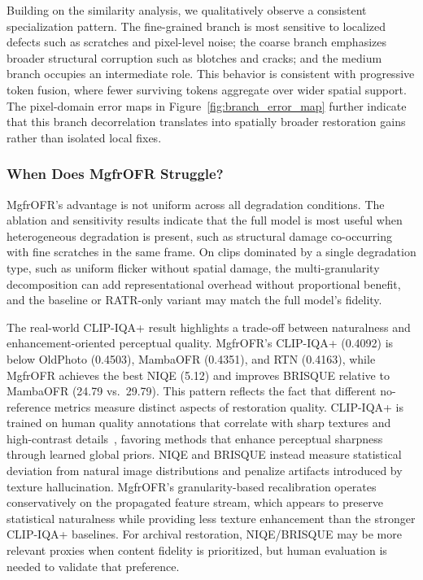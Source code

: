 \documentclass[symmetry,article,submit,pdftex,moreauthors]{Definitions/mdpi}
\begin{document}
Building on the similarity analysis, we qualitatively observe a consistent specialization pattern. The fine-grained branch is most sensitive to localized defects such as scratches and pixel-level noise; the coarse branch emphasizes broader structural corruption such as blotches and cracks; and the medium branch occupies an intermediate role. This behavior is consistent with progressive token fusion, where fewer surviving tokens aggregate over wider spatial support. The pixel-domain error maps in Figure~\ref{fig:branch_error_map} further indicate that this branch decorrelation translates into spatially broader restoration gains rather than isolated local fixes.

\subsubsection{When Does MgfrOFR Struggle?}
\label{subsec:failure}

MgfrOFR's advantage is not uniform across all degradation conditions. The ablation and sensitivity results indicate that the full model is most useful when heterogeneous degradation is present, such as structural damage co-occurring with fine scratches in the same frame. On clips dominated by a single degradation type, such as uniform flicker without spatial damage, the multi-granularity decomposition can add representational overhead without proportional benefit, and the baseline or RATR-only variant may match the full model's fidelity.

The real-world CLIP-IQA+ result highlights a trade-off between naturalness and enhancement-oriented perceptual quality. MgfrOFR's CLIP-IQA+ (0.4092) is below OldPhoto (0.4503), MambaOFR (0.4351), and RTN (0.4163), while MgfrOFR achieves the best NIQE (5.12) and improves BRISQUE relative to MambaOFR (24.79 vs.\ 29.79). This pattern reflects the fact that different no-reference metrics measure distinct aspects of restoration quality. CLIP-IQA+ is trained on human quality annotations that correlate with sharp textures and high-contrast details~\cite{wang2023clipiqa}, favoring methods that enhance perceptual sharpness through learned global priors. NIQE and BRISQUE instead measure statistical deviation from natural image distributions and penalize artifacts introduced by texture hallucination. MgfrOFR's granularity-based recalibration operates conservatively on the propagated feature stream, which appears to preserve statistical naturalness while providing less texture enhancement than the stronger CLIP-IQA+ baselines. For archival restoration, NIQE/BRISQUE may be more relevant proxies when content fidelity is prioritized, but human evaluation is needed to validate that preference.
\end{document}
